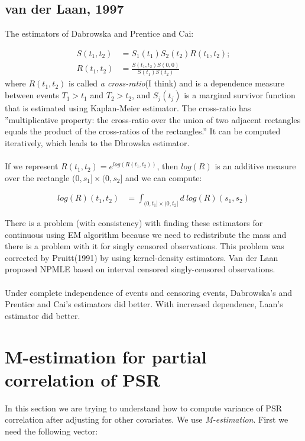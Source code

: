 \documentclass[]{article}
\begin{document}
\subsection{van der Laan, 1997 \cite{van1997nonparametric}}
The estimators of Dabrowska and Prentice and Cai:

	$$
	\begin{aligned}
    S(t_1, t_2) &= S_1(t_1)S_2(t_2)R(t_1, t_2);\\
		R(t_1, t_2) &= \frac{S(t_1, t_2)S(0, 0)}{S(t_1)S(t_2)}
 	\end{aligned}
	$$
where $R(t_1, t_2)$ is called \emph{a cross-ratio}(I think) and is a dependence measure between events $T_1>t_1$ and $T_2>t_2$, and $S_j(t_j)$ is a marginal survivor function that is estimated using Kaplan-Meier estimator. The cross-ratio has ''multiplicative property: the cross-ratio over the union of two adjacent rectangles equals the product of the cross-ratios of the rectangles.'' It can be computed iteratively, which leads to the Dbrowska estimator.\\
\\
If we represent $R(t_1, t_2) = e^{log(R(t_1, t_2))}$, then $log(R)$ is  an additive measure over the rectangle $(0,s_1]\times(0,s_2]$ and we can compute:
	
	$$
	\begin{aligned}
		log(R)(t_1, t_2) &= \int_{(0,t_1]\times(0,t_2]} d~log(R)(s_1,s_2)
 	\end{aligned}
	$$

There is a problem (with consistency) with finding these estimators for continuous using EM algorithm because we need to redistribute the mass and there is a problem with it for singly censored observations. This problem was corrected by Pruitt(1991) by using kernel-density estimators. Van der Laan proposed NPMLE based on interval censored singly-censored observations.\\
\\
Under complete independence of events and censoring events, Dabrowska's and Prentice and Cai's estimators did better. With increased dependence, Laan's estimator did better.



\section{M-estimation for partial correlation of PSR}
In this section we are trying to understand how to compute variance of PSR correlation after adjusting for other covariates. We use \emph{M-estimation}. First we need the following vector:
\end{document}
